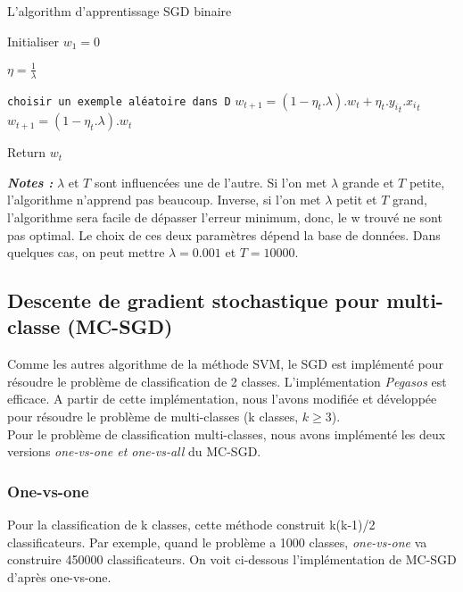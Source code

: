 \begin{algorithm}[H]
\caption{L'algorithm d'apprentissage SGD binaire}\label{sgdal}
\begin{algorithmic}[1]

\State Initialiser $w_1 = 0$


\State $\eta = \frac{1}{\lambda}$

\State \texttt{choisir un exemple aléatoire dans D}
\State $w_{t+1} = (1 - \eta_t.\lambda).w_t + \eta_t.{y_i}_t.{x_i}_t$
\Else
\State $w_{t+1} = (1 - \eta_t.\lambda).w_t$
\EndIf
\EndFor

\EndFor

\State Return $w_{t}$

\EndProcedure
\end{algorithmic}
\end{algorithm}

\textbf{\emph{Notes :}} $\lambda$ et $T$ sont influencées une de l'autre. Si l'on met $\lambda$ grande et $T$ petite, l'algorithme n'apprend pas beaucoup. Inverse, si l'on met $\lambda$ petit et $T$ grand, l'algorithme sera facile de dépasser l'erreur minimum, donc, le w trouvé ne sont pas optimal. Le choix de ces deux paramètres dépend la base de données. Dans quelques cas, on peut mettre $\lambda = 0.001$ et $T = 10000$.


\subsection{Descente de gradient stochastique pour multi-classe (MC-SGD)}
Comme les autres algorithme de la méthode SVM, le SGD est implémenté pour résoudre le problème de classification de 2 classes. L'implémentation \textit{Pegasos} \cite{sss07} est efficace. A partir de cette implémentation, nous l'avons modifiée et développée pour résoudre le problème de multi-classes (k classes, $k \geq 3$). \\

Pour le problème de classification multi-classes, nous avons implémenté les deux versions \textit{one-vs-one et one-vs-all} du MC-SGD.

\subsubsection{One-vs-one}
Pour la classification de k classes, cette méthode construit k(k-1)/2 classificateurs. Par exemple, quand le problème a 1000 classes, \textit{one-vs-one} va construire 450000 classificateurs. On voit ci-dessous l'implémentation de MC-SGD d'après one-vs-one.

